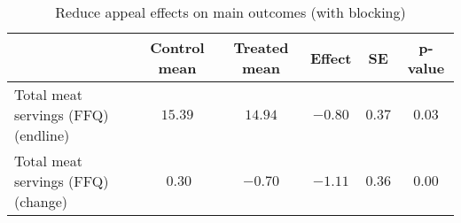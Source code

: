 \begin{table*}[ht]
\caption{Reduce appeal effects on main outcomes (with blocking)\label{round}} 
\begin{center}
\begin{tabular}{lccccc}
\hline\hline
\multicolumn{1}{l}{}&\multicolumn{1}{c}{Control mean}&\multicolumn{1}{c}{Treated mean}&\multicolumn{1}{c}{Effect}&\multicolumn{1}{c}{SE}&\multicolumn{1}{c}{p-value}\tabularnewline
\hline
Total meat servings (FFQ) (endline)&$15.39$&$14.94$&$-0.80$&$0.37$&$0.03$\tabularnewline
Total meat servings (FFQ) (change)&$~0.30$&$-0.70$&$-1.11$&$0.36$&$0.00$\tabularnewline
\hline
\end{tabular}\end{center}

\end{table*}
